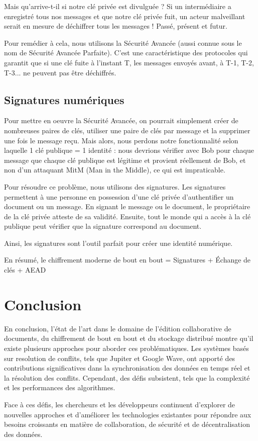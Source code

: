 Mais qu'arrive-t-il si notre clé privée est divulguée ? Si un intermédiaire a enregistré tous nos messages et que notre clé privée fuit, un acteur malveillant serait en mesure de déchiffrer tous les messages ! Passé, présent et futur.

Pour remédier à cela, nous utilisons la Sécurité Avancée (aussi connue sous le nom de Sécurité Avancée Parfaite). C'est une caractéristique des protocoles qui garantit que si une clé fuite à l'instant T, les messages envoyés avant, à T-1, T-2, T-3... ne peuvent pas être déchiffrés.

\subsection{Signatures numériques}

Pour mettre en oeuvre la Sécurité Avancée, on pourrait simplement créer de nombreuses paires de clés, utiliser une paire de clés par message et la supprimer une fois le message reçu. Mais alors, nous perdons notre fonctionnalité selon laquelle 1 clé publique = 1 identité : nous devrions vérifier avec Bob pour chaque message que chaque clé publique est légitime et provient réellement de Bob, et non d'un attaquant \Gls{MitM} (Man in the Middle), ce qui est impraticable.

Pour résoudre ce problème, nous utilisons des signatures. Les signatures permettent à une personne en possession d'une clé privée d'authentifier un document ou un message. En signant le message ou le document, le propriétaire de la clé privée atteste de sa validité. Ensuite, tout le monde qui a accès à la clé publique peut vérifier que la signature correspond au document.

Ainsi, les signatures sont l'outil parfait pour créer une identité numérique.

En résumé, le chiffrement moderne de bout en bout = Signatures + Échange de clés + AEAD

\section{Conclusion}
En conclusion, l'état de l'art dans le domaine de l'édition collaborative de
documents, du chiffrement de bout en bout et du stockage distribué montre qu'il
existe plusieurs approches pour aborder ces problématiques. Les systèmes basés
sur resolution de conflits, tels que Jupiter et Google Wave, ont apporté des
contributions significatives dans la synchronisation des données en temps réel
et la résolution des conflits. Cependant, des défis subsistent, tels que la
complexité et les performances des algorithmes.

Face à ces défis, les chercheurs et les développeurs continuent d'explorer de nouvelles approches et d'améliorer les technologies existantes pour répondre aux besoins croissants en matière de collaboration, de sécurité et de décentralisation des données.